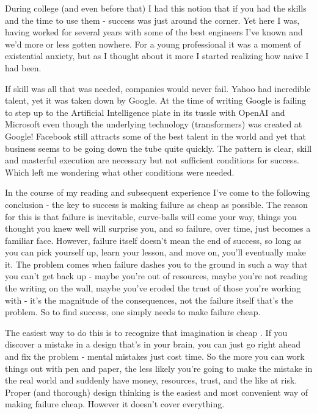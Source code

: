 \documentclass[11pt,a5paper]{book}
\begin{document}
During college (and even before that) I had this notion that if you had the skills and the time to use them - success was just around the corner. Yet here I was, having worked for several years with some of the best engineers I've known and we'd more or less gotten nowhere. For a young professional it was a moment of existential anxiety, but as I thought about it more I started realizing how naive I had been.
\newline

If skill was all that was needed, companies would never fail. Yahoo had incredible talent, yet it was taken down by Google. At the time of writing Google is failing to step up to the Artificial Intelligence plate in its tussle with OpenAI and Microsoft even though the underlying technology (transformers) was created at Google! Facebook still attracts some of the best talent in the world and yet that business seems to be going down the tube quite quickly. The pattern is clear, skill and masterful execution are necessary but not sufficient conditions for success. Which left me wondering what other conditions were needed.
\newline

In the course of my reading and subsequent experience I've come to the following conclusion - the key to success is making failure as cheap as possible. The reason for this is that failure is inevitable, curve-balls will come your way, things you thought you knew well will surprise you, and so failure, over time, just becomes a familiar face. However, failure itself doesn't mean the end of success, so long as you can pick yourself up, learn your lesson, and move on, you'll eventually make it. The problem comes when failure dashes you to the ground in such a way that you can't get back up - maybe you're out of resources, maybe you're not reading the writing on the wall, maybe you've eroded the trust of those you're working with - it's the magnitude of the consequences, not the failure itself that's the problem. So to find success, one simply needs to make failure cheap.
\newline

The easiest way to do this is to recognize that imagination is cheap \cite{macmillan}. If you discover a mistake in a design that's in your brain, you can just go right ahead and fix the problem - mental mistakes just cost time. So the more you can work things out with pen and paper, the less likely you're going to make the mistake in the real world and suddenly have money, resources, trust, and the like at risk. Proper (and thorough) design thinking is the easiest and most convenient way of making failure cheap. However it doesn't cover everything.
\newline
\end{document}
